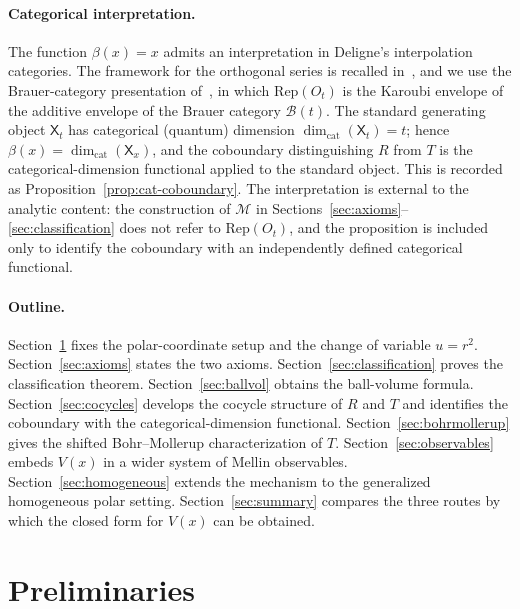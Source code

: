 \documentclass[11pt,a4paper]{article}
\theoremstyle{plain}
\theoremstyle{definition}
\theoremstyle{remark}
\begin{document}
\paragraph{Categorical interpretation.}
The function $\beta(x) = x$ admits an interpretation in Deligne's interpolation categories. The framework for the orthogonal series is recalled in~\cite[\S\S 9--10]{Deligne2007}, and we use the Brauer-category presentation of~\cite[\S\S 2.1--2.2]{ComesHeidersdorf2017}, in which $\mathrm{Rep}(O_t)$ is the Karoubi envelope of the additive envelope of the Brauer category $\mathcal B(t)$. The standard generating object $\mathsf X_t$ has categorical (quantum) dimension $\dim_{\mathrm{cat}}(\mathsf X_t) = t$; hence $\beta(x) = \dim_{\mathrm{cat}}(\mathsf X_x)$, and the coboundary distinguishing $R$ from $T$ is the categorical-dimension functional applied to the standard object. This is recorded as Proposition~\ref{prop:cat-coboundary}. The interpretation is external to the analytic content: the construction of $\mathcal M$ in Sections~\ref{sec:axioms}--\ref{sec:classification} does not refer to $\mathrm{Rep}(O_t)$, and the proposition is included only to identify the coboundary with an independently defined categorical functional.

\paragraph{Outline.}
Section~\ref{sec:prelim} fixes the polar-coordinate setup and the change of variable $u=r^2$. Section~\ref{sec:axioms} states the two axioms. Section~\ref{sec:classification} proves the classification theorem. Section~\ref{sec:ballvol} obtains the ball-volume formula. Section~\ref{sec:cocycles} develops the cocycle structure of $R$ and $T$ and identifies the coboundary with the categorical-dimension functional. Section~\ref{sec:bohrmollerup} gives the shifted Bohr--Mollerup characterization of $T$. Section~\ref{sec:observables} embeds $V(x)$ in a wider system of Mellin observables. Section~\ref{sec:homogeneous} extends the mechanism to the generalized homogeneous polar setting. Section~\ref{sec:summary} compares the three routes by which the closed form for $V(x)$ can be obtained.

\section{Preliminaries}\label{sec:prelim}
\end{document}
